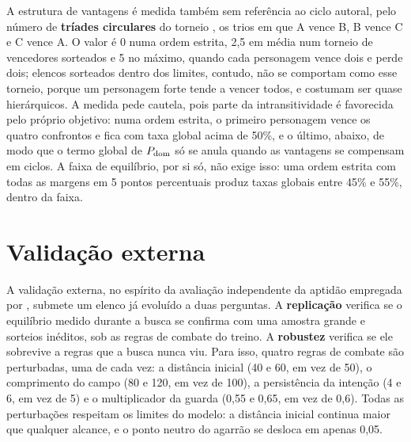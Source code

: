 A estrutura de vantagens é medida também sem referência ao ciclo autoral, pelo número de \textbf{tríades circulares} do torneio \cite{kendall1940method}, os trios em que A vence B, B vence C e C vence A. O valor é 0 numa ordem estrita, 2,5 em média num torneio de vencedores sorteados e 5 no máximo, quando cada personagem vence dois e perde dois; elencos sorteados dentro dos limites, contudo, não se comportam como esse torneio, porque um personagem forte tende a vencer todos, e costumam ser quase hierárquicos. A medida pede cautela, pois parte da intransitividade é favorecida pelo próprio objetivo: numa ordem estrita, o primeiro personagem vence os quatro confrontos e fica com taxa global acima de 50\%, e o último, abaixo, de modo que o termo global de $P_{\mathrm{dom}}$ só se anula quando as vantagens se compensam em ciclos. A faixa de equilíbrio, por si só, não exige isso: uma ordem estrita com todas as margens em 5 pontos percentuais produz taxas globais entre 45\% e 55\%, dentro da faixa.

\section{Validação externa}
\label{sec: validacao_externa}

A validação externa, no espírito da avaliação independente da aptidão empregada por , submete um elenco já evoluído a duas perguntas. A \textbf{replicação} verifica se o equilíbrio medido durante a busca se confirma com uma amostra grande e sorteios inéditos, sob as regras de combate do treino. A \textbf{robustez} verifica se ele sobrevive a regras que a busca nunca viu. Para isso, quatro regras de combate são perturbadas, uma de cada vez: a distância inicial (40 e 60, em vez de 50), o comprimento do campo (80 e 120, em vez de 100), a persistência da intenção (4 e 6, em vez de 5) e o multiplicador da guarda (0,55 e 0,65, em vez de 0,6). Todas as perturbações respeitam os limites do modelo: a distância inicial continua maior que qualquer alcance, e o ponto neutro do agarrão se desloca em apenas 0,05.

